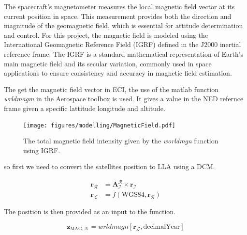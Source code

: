 
The spacecraft's magnetometer measures the local magnetic field vector at its current position in space. 
This measurement provides both the direction and magnitude of the geomagnetic field, which is essential for attitude determination and control. 
For this project, the magnetic field is modeled using the International Geomagnetic Reference Field (IGRF) defined in the J2000 inertial reference frame. 
The IGRF is a standard mathematical representation of Earth's main magnetic field and its secular variation, commonly used in space applications to ensure 
consistency and accuracy in magnetic field estimation.
\vspace{0.5cm}

\noindent The get the magnetic field vector in ECI, the use of the matlab function \textit{wrldmagm} in the Aerospace toolbox is used. It gives a value in the NED refernce frame
given a specific lattitude longitude and altitude.
\vspace{0.5cm}

\begin{figure}[H]
    \centering
    \texttt{[image: figures/modelling/MagneticField.pdf]}
    \caption{The total magnetic field intensity given by the \textit{worldmgn} function using IGRF.}
    \label{fig:MagneticField}
\end{figure}


\noindent so first we need to convert the satellites position to LLA using a DCM.

\begin{equation}
    \begin{split}
    \mathbf{r}_\mathcal{R} &= \mathbf{A}_\mathcal{I}^\mathcal{R} \times \mathbf{r}_\mathcal{I} \\
    \mathbf{r}_\mathcal{L} &= f(\text{WGS84},\mathbf{r}_\mathcal{R})        
    \end{split}
\end{equation}

\noindent The position is then provided as an input to the function.

\begin{equation}
    \mathbf{z}_{\text{MAG},\mathcal{N}} = \textit{wrldmagn}[\mathbf{r}_\mathcal{L}, \text{decimalYear}]
\end{equation}

